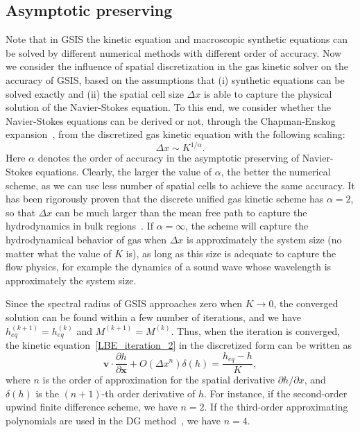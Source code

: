 
\subsection{Asymptotic preserving}

Note that in GSIS the kinetic equation and macroscopic synthetic equations can be solved by different numerical methods with different order of accuracy. Now we consider the influence of spatial discretization in the gas kinetic solver on the accuracy of GSIS, based on the assumptions that (i) synthetic equations can be solved exactly and (ii) the spatial cell size $\Delta{x}$ is able to capture the physical solution of the Navier-Stokes equation. To this end, we consider whether the Navier-Stokes equations can be derived or not, through the Chapman-Enskog expansion~\cite{CE}, from the discretized gas kinetic equation with the following scaling:
\begin{equation}\label{scaling}
\Delta{x}\sim{K^{1/\alpha}}.
\end{equation}
Here $\alpha$ denotes the order of accuracy in the asymptotic preserving of Navier-Stokes equations. Clearly, the larger the value of $\alpha$, the better the numerical scheme, as we can use less number of spatial cells to achieve the same accuracy. It has been rigorously proven that the discrete unified gas kinetic scheme has $\alpha=2$, so that $\Delta{x}$ can be much larger than the mean free path to capture the hydrodynamics in bulk regions~\cite{Guo2019UP_arXiv}. If $\alpha=\infty$, the scheme will capture the hydrodynamical behavior of gas when $\Delta{x}$ is approximately the system size (no matter what the value of $K$ is), as long as this size is adequate to capture the flow physics, for example the dynamics of a sound wave whose wavelength is approximately the system size.


Since the spectral radius of GSIS approaches zero when $K\rightarrow0$, the converged solution can be found within a few number of iterations, and we have $h_{eq}^{(k+1)}=h_{eq}^{(k)}$ and $M^{(k+1)}=M^{(k)}$. Thus, when the iteration is converged, the kinetic equation~\eqref{LBE_iteration_2} in the discretized form can be written as
\begin{equation}\label{LBE_GSIS}
\bm{v}\cdot\frac{\partial{h}}{\partial\bm{x}}+O(\Delta{x}^n)\delta(h)=\frac{h_{eq}-h}{K},
\end{equation}
where  $n$ is the order of approximation for the spatial derivative $\partial {h}/\partial{x}$, and $\delta(h)$ is the $(n+1)$-th order derivative of $h$. For instance, if the second-order upwind finite difference scheme, we have $n=2$. If the third-order approximating polynomials are used in the DG method~\cite{WeiSuJCP1,Su2019IDG}, we have $n=4$. %





